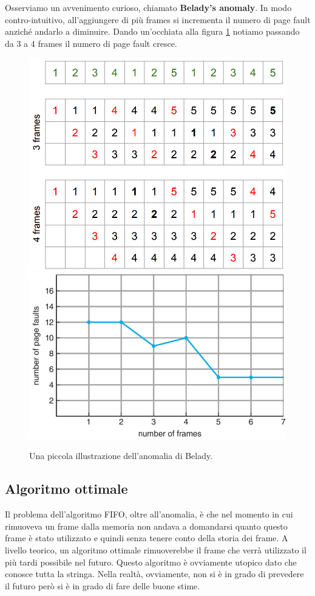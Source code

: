 Osserviamo un avvenimento curioso, chiamato \textbf{Belady's anomaly}. In modo contro-intuitivo, all'aggiungere di più frames si incrementa il numero di page fault anziché andarlo a diminuire. Dando un'occhiata alla figura \ref{fig:beladys} notiamo passando da 3 a 4 frames il numero di page fault cresce.
\begin{figure}[h]
    \centering
    \includegraphics[width = .40\textwidth]{../res/imgs/virtual memory/belady1.png}
    \includegraphics[width = .45\textwidth]{../res/imgs/virtual memory/belady2.png}
    \caption{Una piccola illustrazione dell'anomalia di Belady.}
    \label{fig:beladys}
\end{figure}

% 
\subsection{Algoritmo ottimale}
Il problema dell'algoritmo FIFO, oltre all'anomalia, è che nel momento in cui rimuoveva un frame dalla memoria non andava a domandarsi quanto questo frame è stato utilizzato e quindi senza tenere conto della storia dei frame. A livello teorico, un algoritmo ottimale rimuoverebbe il frame che verrà utilizzato il più tardi possibile nel futuro. Questo algoritmo è ovviamente utopico dato che conosce tutta la stringa. Nella realtà, ovviamente, non si è in grado di prevedere il futuro però si è in grado di fare delle buone stime.


